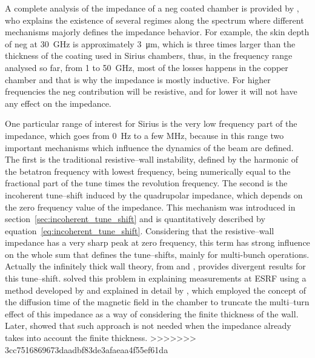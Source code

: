     A complete analysis of the impedance of a \gls{neg} coated chamber is provided by , who explains the existence of several regimes along the spectrum where different mechanisms majorly defines the impedance behavior. For example, the skin depth of \gls{neg} at \SI{30}{\giga\hertz} is approximately \SI{3}{\micro\meter}, which is three times larger than the thickness of the coating used in Sirius chambers, thus, in the frequency range analysed so far, from \SI{1}{} to \SI{50}{\giga\hertz}, most of the losses happens in the copper chamber and that is why the impedance is mostly inductive. For higher frequencies the \gls{neg} contribution will be resistive, and for lower it will not have any effect on the impedance.

    One particular range of interest for Sirius is the very low frequency part of the impedance, which goes from \SI{0}{\hertz} to a few \si{\mega\hertz}, because in this range two important mechanisms which influence the dynamics of the beam are defined. The first is the traditional resistive--wall instability, defined by the harmonic of the betatron frequency with lowest frequency, being numerically equal to the fractional part of the tune times the revolution frequency. The second is the incoherent tune--shift induced by the quadrupolar impedance, which depends on the zero frequency value of the impedance. This mechanism was introduced in section~\ref{sec:incoherent_tune_shift} and is quantitatively described by equation~\eqref{eq:incoherent_tune_shift}. Considering that the resistive--wall impedance has a very sharp peak at zero frequency, this term has strong influence on the whole sum that defines the tune--shifts, mainly for multi-bunch operations. Actually the infinitely thick wall theory, from  and , provides divergent results for this tune--shift.  solved this problem in explaining measurements at ESRF using a method developed by  and explained in detail by , which employed the concept of the diffusion time of the magnetic field in the chamber to truncate the multi--turn effect of this impedance as a way of considering the finite thickness of the wall. Later,  showed that such approach is not needed when the impedance already takes into account the finite thickness.
>>>>>>> 3cc7516869673daadbf83de3afaeaa4f55ef61da

